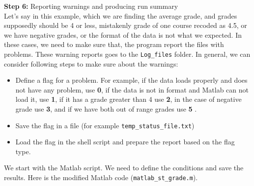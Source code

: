 \textbf{Step 6:} Reporting warnings and producing run summary\\
\noindent
Let's say in this example, which we are finding the average grade, and grades supposedly should be 4 or less, mistakenly grade of one course recoded as 4.5, or we have negative grades, or the format of the data is not what we expected. In these cases, we need to make sure that, the program report the files with problems. These warning reports goes to the \texttt{Log\_files} folder. In general, we can consider following steps to make sure about the warnings:\\

\begin{itemize}

\item{Define a flag for a problem. For example, if the data loads properly and does not have any problem, use \textbf{0}, if the data is not in format and Matlab can not load it, use \textbf{1}, if it has a grade greater than 4 use \textbf{2}, in the case of negative grade use \textbf{3}, and if we have both out of range grades use \textbf{5} }.
\item{Save the flag in a file (for example \texttt{temp\_status\_file.txt})}
\item{Load the flag in the shell script and prepare the report based on the flag type.}

\end{itemize}

\noindent
We start with the Matlab script. We need to define the conditions and save the results. Here is the modified Matlab code (\texttt{matlab\_st\_grade.m}).\\
\\

